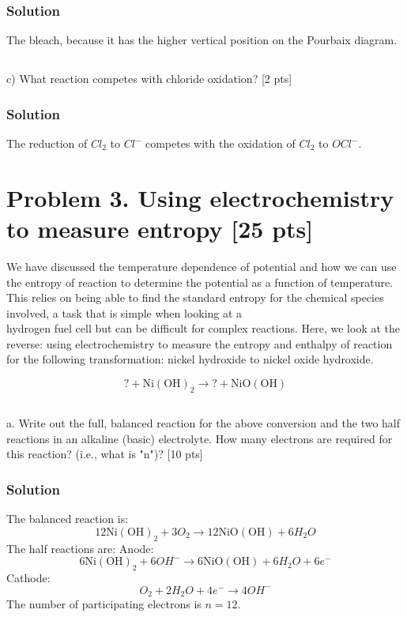 \documentclass[12pt]{article}
\begin{document}
\subsubsection{Solution}
The bleach, because it has the higher vertical position on the Pourbaix diagram.
\subsection{}
c) What reaction competes with chloride oxidation? [2 pts]
\subsubsection{Solution}
The reduction of $Cl_2$ to $Cl^-$ competes with the oxidation of $Cl_2$ to $OCl^-$.

\section{Problem 3. Using electrochemistry to measure entropy [25 pts]}
We have discussed the temperature dependence of potential and how we can use the entropy of reaction to determine the potential as a function of temperature. This relies on being able to find the standard entropy for the chemical species involved, a task that is simple when looking at a\\
hydrogen fuel cell but can be difficult for complex reactions. Here, we look at the reverse: using electrochemistry to measure the entropy and enthalpy of reaction for the following transformation: nickel hydroxide to nickel oxide hydroxide.

$$
?+\mathrm{Ni}(\mathrm{OH})_{2} \rightarrow ?+\mathrm{NiO}(\mathrm{OH})
$$
\subsection{}
a. Write out the full, balanced reaction for the above conversion and the two half reactions in an alkaline (basic) electrolyte. How many electrons are required for this reaction? (i.e., what is "n")? [10 pts]\\
\subsubsection{Solution}
The balanced reaction is:
\begin{equation}
    12\mathrm{Ni}(\mathrm{OH})_{2} + 3O_2 \rightarrow 12\mathrm{NiO}(\mathrm{OH}) + 6H_2O 
\end{equation}
The half reactions are:
Anode:
\begin{equation}
    6\mathrm{Ni}(\mathrm{OH})_{2} + 6OH^- \rightarrow 6\mathrm{NiO}(\mathrm{OH}) + 6H_2O + 6e^-
\end{equation}
Cathode:
\begin{equation}
    O_2 + 2H_2O + 4e^- \rightarrow 4OH^-
\end{equation}
The number of participating electrons is $n=12$.
\end{document}
